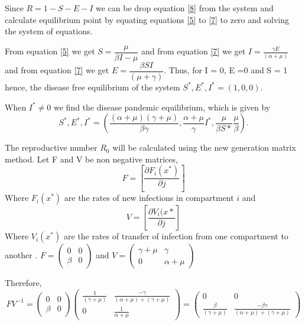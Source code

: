  
Since $R = 1- S - E - I$
we can be drop equation \ref{8} from the system and  calculate equilibrium point by equating equations \ref{5} to \ref{7} to zero and solving the system of equations.

From equation \eqref{5} we get
$S = \dfrac{\mu}{\beta I - \mu}$ and from equation \ref{7} we get $I = \frac{\gamma E}{ (\alpha + \mu)}$ and from equation \ref{7} we get $ E = \dfrac{ \beta S I}{(\mu + \gamma)}$. Thus, for I = 0, E =0 and S = 1 hence, the disease free equilibrium of the system $S^*, E^*, I^* = (1,0,0)$.

 When $I^* \neq 0$ we find the disease pandemic equilibrium, which is given by
\begin{equation*}
S^*, E^*, I^*  = \left(\frac{(\alpha + \mu)(\gamma + \mu)}{\beta \gamma} , \frac{\alpha + \mu }{ \gamma} I^*, \frac{\mu}{\beta S*} \frac{\mu}{\beta} \right).
\end{equation*}

The reproductive number $R_0$  will be calculated using the new generation matrix method. Let F and V be non negative matrices,
\begin{equation}
F = \left[ \frac{\partial F_i (x^*)}{\partial j}\right]
\end{equation}  Where  $F_i (x^*)$ are the rates of new infections in compartment $i$ and 
\begin{equation}
 V = \left[\dfrac{\partial V_i(x*}{\partial j} \right]
\end{equation}
  Where $V_i (x^*)$ are the rates of transfer of infection from one compartment to another \citep{van2002reproduction}.
  $F =\left(\begin{array}{cc} 
0&0 \\ \beta&0
\end{array} \right)$ and $V = \left(\begin{array}{cc} \gamma + \mu & \gamma \\ 0& \alpha + \mu \end{array} \right)$


Therefore,
\begin{equation}\label{4.2.29}
FV^{-1} = \left(\begin{array}{cc} 
0&0 \\ \beta&0
\end{array} \right) \left(\begin{array}{cc}
\frac{1}{(\gamma + \mu)}&  \frac{-\gamma}{(\alpha +\mu)+ (\gamma + \mu)}\\ 0& \frac{1}{\alpha + \mu}  

\end{array} \right) = \left(\begin{array}{cc} 0&0 \\
\frac{\beta}{(\gamma + \mu)} &\frac{- \beta\gamma}{(\alpha +\mu)+ (\gamma + \mu)} 
\end{array}\right)
\end{equation}

